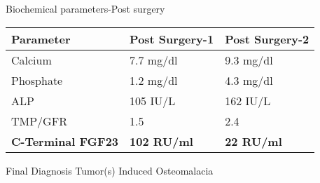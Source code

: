 \begin{frame}{Biochemical parameters-Post surgery}
\begin{center}
		\begin{tabular}{p{4cm}p{3.5cm}l}
			\toprule
			Parameter                 & Post Surgery-1             & Post Surgery-2      \\ 
            \midrule
			Calcium                   &  7.7 mg/dl            & 9.3 mg/dl          \\
			Phosphate                 & 1.2 mg/dl            & 4.3 mg/dl        \\
			ALP                       & 105 IU/L             & 162 IU/L         \\
            TMP/GFR                   & 1.5                  & 2.4   \\   
			\textbf{C-Terminal FGF23} & \textbf{102 RU/ml} & \textbf{22 RU/ml} \\
			 \bottomrule

		\end{tabular} 
\end{center}
\end{frame}
\begin{frame} {Final Diagnosis}
	\center Tumor(s) Induced Osteomalacia 
\end{frame}


